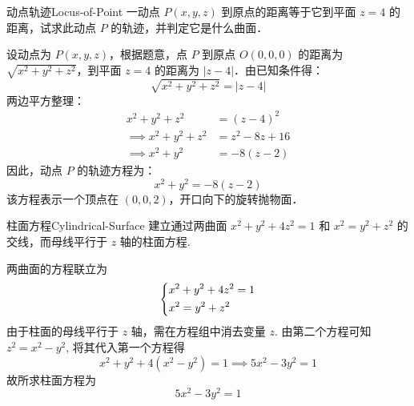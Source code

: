 
\begin{problem}{动点轨迹}{Locus-of-Point}
    一动点 $P(x, y, z)$ 到原点的距离等于它到平面 $z = 4$ 的距离，试求此动点 $P$ 的轨迹，并判定它是什么曲面．
\end{problem}

\begin{solution}
    设动点为 $P(x, y, z)$，根据题意，点 $P$ 到原点 $O(0, 0, 0)$ 的距离为 $\sqrt{x^2 + y^2 + z^2}$，到平面 $z = 4$ 的距离为 $|z - 4|$．由已知条件得：
    \begin{equation}
        \sqrt{x^2 + y^2 + z^2} = |z - 4|
    \end{equation}
    两边平方整理：
    \begin{equation}
        \begin{aligned}
            x^2 + y^2 + z^2          & = (z - 4)^2     \\
            \implies x^2 + y^2 + z^2 & = z^2 - 8z + 16 \\
            \implies x^2 + y^2       & = -8(z - 2)
        \end{aligned}
    \end{equation}
    因此，动点 $P$ 的轨迹方程为：
    \begin{equation}
        \boxed{x^2 + y^2 = -8(z - 2)}
    \end{equation}
    该方程表示一个顶点在 $(0, 0, 2)$，开口向下的旋转抛物面．
\end{solution}


\begin{problem}{柱面方程}{Cylindrical-Surface}
    建立通过两曲面 $x^2 + y^2 + 4z^2 = 1$ 和 $x^2 = y^2 + z^2$ 的交线，而母线平行于 $z$ 轴的柱面方程.
\end{problem}

\begin{solution}
    两曲面的方程联立为
    \begin{equation}
        \begin{dcases}
            x^2 + y^2 + 4z^2 = 1 \\
            x^2 = y^2 + z^2
        \end{dcases}
    \end{equation}
    由于柱面的母线平行于 $z$ 轴，需在方程组中消去变量 $z$. 由第二个方程可知 $z^2 = x^2 - y^2$, 将其代入第一个方程得
    \begin{equation}
        x^2 + y^2 + 4(x^2 - y^2) = 1 \implies 5x^2 - 3y^2 = 1
    \end{equation}
    故所求柱面方程为
    \begin{equation}
        \boxed{5x^2 - 3y^2 = 1}
    \end{equation}
\end{solution}


